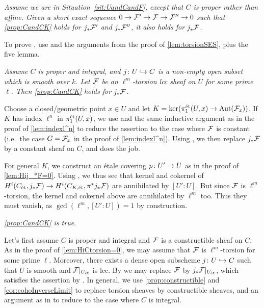\begin{proof*}
	\begin{numerate}
		\item[\itememph{5}] \itshape Assume we are in Situation~\cref{sit:UandCandF}, except that $C$ is proper rather than affine. Given a short exact sequence $0\morphism \Ff'\morphism \Ff\morphism \Ff''\morphism 0$ such that \cref{prop:CandCK} holds for $j_*\mathcal{F}'$ and $j_*\mathcal{F}''$, it also holds for $j_*\mathcal{F}$.
	\end{numerate}
	To prove , use  and the arguments from the proof of \cref{lem:torsionSES}, plus the five lemma.
	\begin{numerate}
		\item[\itememph{6}] \itshape Assume $C$ is proper and integral, and $j\colon U\monomorphism C$ is a non-empty open subset which is smooth over $k$. Let $\mathcal{F}$ be an $\ell^m$-torsion lcc sheaf on $U$ for some prime $\ell$. Then \cref{prop:CandCK} holds for $j_*\mathcal{F}$.
	\end{numerate}
	Choose a closed/geometric point $x\in U$ and let $K=\ker(\pi_1^\et(U,x)\morphism \Aut(\Ff_x))$. If $K$ has index $\ell^n$ in $\pi_1^{\mathrm{\acute{e}t}}(U,x)$, we use  and the same inductive argument as in the proof of \cref{lem:indexl^n} to reduce the assertion to the case where $\mathcal{F}$ is constant (i.e.\ the case $G=\mathcal{F}_x$ in the proof of \cref{lem:indexl^n}). Using , we then replace $j_*\mathcal{F}$ by a constant sheaf on $C$, and  does the job.
	
	For general $K$, we construct an étale covering $p\colon U'\morphism U$ as in the proof of \cref{lem:Hij_*F=0}. Using , we thus see that kernel and cokernel of $H^i(C_\et,j_*\Ff)\morphism H^i(C_{K,\et},\pi^*j_*\Ff)$ are annihilated by $[U':U]$. But since $\mathcal{F}$ is $\ell^m$-torsion, the kernel and cokernel above are annihilated by $\ell^m$ too. Thus they must vanish, as $\gcd(\ell^m,[U':U])=1$ by construction.
	\begin{numerate}
		\item[\itememph{7}] \itshape \cref{prop:CandCK} is true.
	\end{numerate}
	Let's first assume $C$ is proper and integral and $\mathcal{F}$ is a constructible sheaf on $C$. As in the proof of \cref{lem:HiCtorsion=0}, we may assume that $\mathcal{F}$ is $\ell^m$-torsion for some prime $\ell$. Moreover, there exists a dense open subscheme $j\colon U\monomorphism C$ such that $U$ is smooth and $\mathcal{F}|_{U_{\mathrm{\acute{e}t}}}$ is lcc. By  we may replace $\mathcal{F}$ by $j_*\mathcal{F}|_{U_{\mathrm{\acute{e}t}}}$, which satisfies the assertion by . In general, we use \cref{prop:constructible} and \cref{cor:cohoInverseLimit} to replace torsion sheaves by constructible sheaves, and an argument as in  to reduce to the case where $C$ is integral.
\end{proof*}